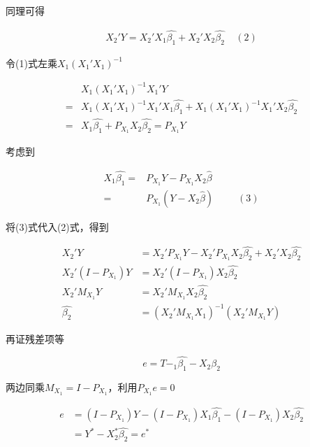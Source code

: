 \documentclass{article}
\begin{document}
\begin{enumerate}
        同理可得

        $$
          \begin{aligned}
            X_2'Y = X_2'X_1\widehat{\beta_1} + X_2'X_2\widehat{\beta_2} \ \ \ \ \ (2)
          \end{aligned}
        $$

        令(1)式左乘$X_1(X_1'X_1)^{-1}$

        $$
          \begin{aligned}
            & X_1(X_1'X_1)^{-1}X_1'Y \\
            = & X_1(X_1'X_1)^{-1}X_1'X_1\widehat{\beta_1} + X_1(X_1'X_1)^{-1}X_1'X_2\widehat{\beta_2} \\
            = & X_1\widehat{\beta_1}+P_{X_1}X_2\widehat{\beta_2} = P_{X_1}Y
          \end{aligned}
        $$

        考虑到

        $$
          \begin{aligned}
            X_1\widehat{\beta_1} = & P_{X_1}Y - P_{X_1}X_2\widehat{\beta} \\
            = & P_{X_1}(Y-X_2\widehat{\beta}) \ \ \ \ \ \ \ \ \ \ \ (3)
          \end{aligned}
        $$

        将(3)式代入(2)式，得到

        $$
          \begin{aligned}
            X_2'Y &= X_2'P_{X_1}Y - X_2'P_{X_1}X_2\widehat{\beta_2}+X_2'X_2\widehat{\beta_2} \\
            X_2'(I-P_{X_1})Y &= X_2'(I-P_{X_1})X_2\widehat{\beta_2} \\
            X_2'M_{X_1}Y &= X_2'M_{X_1}X_2\widehat{\beta_2} \\
            \widehat{\beta_2} &= (X_2'M_{X_1}X_1)^{-1}(X_2'M_{X_1}Y)
          \end{aligned}
        $$

        再证残差项等

        $$
          e = T - _1\widehat{\beta_1}-X_2\widehat{\beta_2}
        $$

        两边同乘$M_{X_1} = I-P_{X_1}$，利用$P_{X_1}e=0$

        $$
          \begin{aligned}
            e &= (I-P_{X_1})Y-(I-P_{X_1})X_1\widehat{\beta_1} - (I-P_{X_1})X_2\widehat{\beta_2} \\
            &= Y^* - X_2^*\widehat{\beta_2}=e^*
          \end{aligned}
        $$


\end{enumerate}
\end{document}
